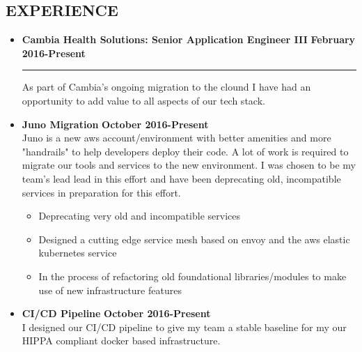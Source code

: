 \documentclass[overlapped]{res}
\begin{document}
\begin{resume}
\section{EXPERIENCE}
\vspace{0.125in}

\begin{itemize}[leftmargin=0in]
    \item[] 
        \textbf{Cambia Health Solutions: Senior Application Engineer III} \hfill \textbf{February 2016-Present} \\[-0.1in] \rule{\textwidth}{0.5pt}
        As part of Cambia's ongoing migration to the clound I have had an opportunity to add value to all aspects of our tech stack.
        \vspace{0.125in}
        \item[] 
            \begin{samepage}
                \textbf{Juno Migration} \hfill \textbf{October 2016-Present} \\
                Juno is a new aws account/environment with better amenities and more "handrails" to help developers deploy their code. 
                A lot of work is required to migrate our tools and services to the new environment. I was chosen to be my team's lead 
                lead in this effort and have been deprecating old, incompatible services in preparation for this effort.
                \begin{itemize}
                    \item[\textbullet] Deprecating very old and incompatible services
                    \item[\textbullet] Designed a cutting edge service mesh based on envoy and the aws elastic kubernetes service
                    \item[\textbullet] In the process of refactoring old foundational libraries/modules to make use of new infrastructure features 
                \end{itemize}
            \end{samepage}
            \vspace{0.125in}
        \item[] 
            \begin{samepage}
                \textbf{CI/CD Pipeline} \hfill \textbf{October 2016-Present} \\
                I designed our CI/CD pipeline to give my team a stable baseline for my our HIPPA compliant docker based infrastructure.

\end{samepage}
\end{itemize}
\end{resume}
\end{document}
